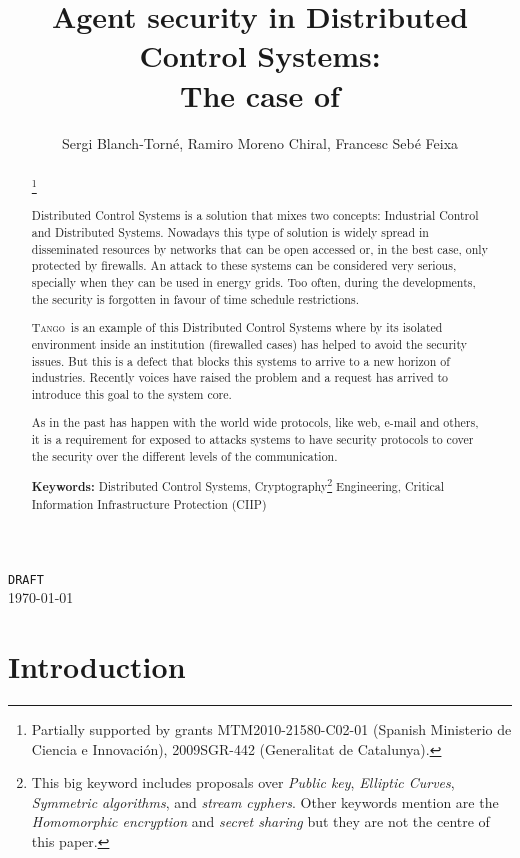 \documentclass[10pt,a4paper,twoside]{llncs}
\title{Agent security in Distributed Control Systems: \\The case of \tango}
\author{Sergi Blanch-Torn\'e\inst{1}, Ramiro Moreno Chiral\inst{2}, Francesc Seb\'e Feixa\inst{2}}
\institute{
 Escola Polit\`ecnica Superior, Universitat de Lleida. Spain.\\
 \email{\tt sblanch@alumnes.udl.es}
  \and 
  Departament de Matem\`atica. Universitat de Lleida. Spain.\\
  \email{\tt \{ramiro,fsebe\}@matematica.udl.es}
 }
\newcommand{\tango}{\textsc{Tango}}
\begin{document}
\maketitle
\begin{center}
 {\tt DRAFT}\\
 \today\\
\end{center}

\begin{abstract}\footnote{Partially supported by grants MTM2010-21580-C02-01 (Spanish Ministerio de Ciencia e Innovaci\'on), 2009SGR-442 (Generalitat de Catalunya).}
 
    Distributed Control Systems is a solution that mixes two concepts: Industrial Control and Distributed Systems. Nowadays this type of solution is widely spread in disseminated resources by networks that can be open accessed or, in the best case, only protected by firewalls. An attack to these systems can be considered very serious, specially when they can be used in energy grids. Too often, during the developments, the security is forgotten in favour of time schedule restrictions.

    \tango\, is an example of this Distributed Control Systems where by its isolated environment inside an institution (firewalled cases) has helped to avoid the security issues. But this is a defect that blocks this systems to arrive to a new horizon of industries. Recently voices have raised the problem and a request has arrived to introduce this goal to the system core.

    As in the past has happen with the world wide protocols, like web, e-mail and others, it is a requirement for exposed to attacks systems to have security protocols to cover the security over the different levels of the communication.

{\bf Keywords:} Distributed Control Systems, Cryptography\footnote{This big keyword includes proposals over \emph{Public key}, \emph{Elliptic Curves}, \emph{Symmetric algorithms}, and \emph{stream cyphers}. Other keywords mention are the \emph{Homomorphic encryption} and \emph{secret sharing} but they are not the centre of this paper.} Engineering, Critical Information Infrastructure Protection (CIIP)

\end{abstract}

\section{Introduction}\label{sec:introduction}
\end{document}

